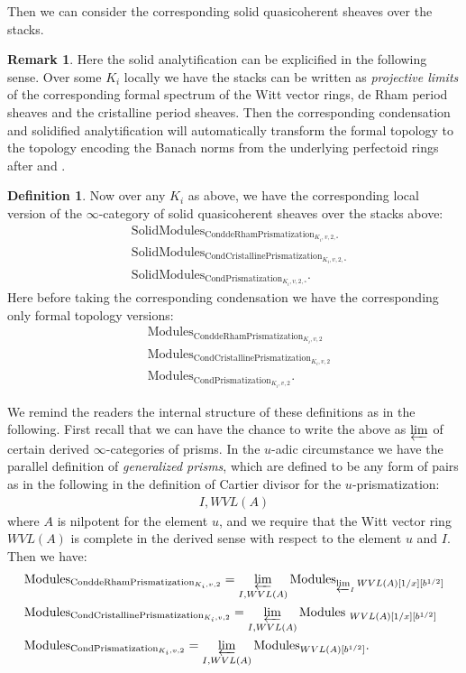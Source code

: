 \documentclass[12pt]{article}
\theoremstyle{definition}
\newtheorem{remark}{Remark}
\newtheorem{definition}{Definition}
\begin{document}
Then we can consider the corresponding solid quasicoherent sheaves over the stacks. 

\begin{remark}
Here the solid analytification can be explicified in the following sense. Over some $K_i$ locally we have the stacks can be written as \textit{projective limits} of the corresponding formal spectrum of the Witt vector rings, de Rham period sheaves and the cristalline period sheaves. Then the corresponding condensation and solidified analytification will automatically transform the formal topology to the topology encoding the Banach norms from the underlying perfectoid rings after \cite{1KL} and \cite{1KL1}.
\end{remark}

\begin{definition}
Now over any $K_i$ as above, we have the corresponding local version of the $\infty$-category of solid quasicoherent sheaves over the stacks above:
 \begin{align}
&\mathrm{SolidModules}_{\mathrm{ConddeRhamPrismatization}_{K_i,v,2,\square}}\\
&\mathrm{SolidModules}_{\mathrm{CondCristallinePrismatization}_{K_i,v,2,\square}}\\
&\mathrm{SolidModules}_{\mathrm{CondPrismatization}_{K_i,v,2,\square}}.
\end{align}
Here before taking the corresponding condensation we have the corresponding only formal topology versions:
 \begin{align}
&\mathrm{Modules}_{\mathrm{ConddeRhamPrismatization}_{K_i,v,2}}\\
&\mathrm{Modules}_{\mathrm{CondCristallinePrismatization}_{K_i,v,2}}\\
&\mathrm{Modules}_{\mathrm{CondPrismatization}_{K_i,v,2}}.
\end{align}
\end{definition}

We remind the readers the internal structure of these definitions as in the following. First recall that we can have the chance to write the above as $\varprojlim$ of certain derived $\infty$-categories of prisms. In the $u$-adic circumstance we have the parallel definition of \textit{generalized prisms}, which are defined to be any form of pairs as in the following in the definition of Cartier divisor for the $u$-prismatization:
\begin{align}
I,WVL(A)
\end{align}
where $A$ is nilpotent for the element $u$, and we require that the Witt vector ring $WVL(A)$ is complete in the derived sense with respect to the element $u$ and $I$. Then we have:
\begin{align}
&\mathrm{Modules}_{\mathrm{ConddeRhamPrismatization}_{K_i,v,2}}=\varprojlim_{{I,WVL(A)}} \mathrm{Modules}_{\varprojlim_{I}WVL(A)[1/x][b^{1/2}]}\\
&\mathrm{Modules}_{\mathrm{CondCristallinePrismatization}_{K_i,v,2}}=\varprojlim_{{I,WVL(A)}} \mathrm{Modules}_{\ WVL(A)[1/x][b^{1/2}]}\\
&\mathrm{Modules}_{\mathrm{CondPrismatization}_{K_i,v,2}}=\varprojlim_{{I,WVL(A)}} \mathrm{Modules}_{WVL(A)[b^{1/2}]}.
\end{align}
\end{document}
